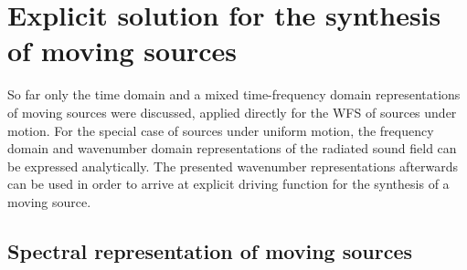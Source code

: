\section{Explicit solution for the synthesis of moving sources}

So far only the time domain and a mixed time-frequency domain representations of moving sources were discussed, applied directly for the WFS of sources under motion.
For the special case of sources under uniform motion, the frequency domain and wavenumber domain representations of the radiated sound field can be expressed analytically.
The presented wavenumber representations afterwards can be used in order to arrive at explicit driving function for the synthesis of a moving source.

\subsection{Spectral representation  of moving sources}

